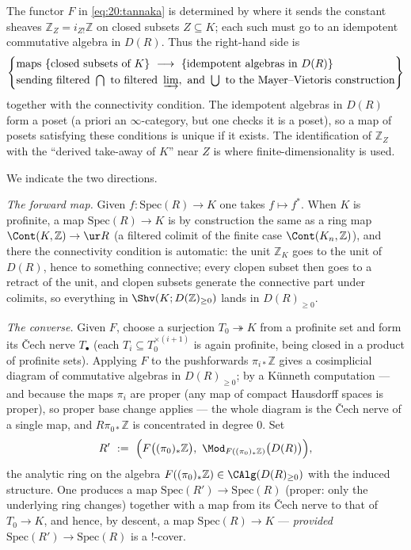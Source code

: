 \begin{remark}
\label{rmk:20:idempotents}
The functor $F$ in \eqref{eq:20:tannaka} is determined by where it sends the
constant sheaves $\mathbb Z_Z=i_{Z!}\mathbb Z$ on closed subsets $Z\subseteq K$;
each such must go to an idempotent commutative algebra in $D(R)$. Thus the
right-hand side is
\begin{equation*}
\left\{
\begin{aligned}
&\text{maps }\{\text{closed subsets of }K\}\ \longrightarrow\ \{\text{idempotent
algebras in }D(R)\}\\
&\text{sending filtered }\textstyle\bigcap\text{ to filtered }\varinjlim,\
\text{and }\bigcup\text{ to the Mayer--Vietoris construction}
\end{aligned}
\right\}
\end{equation*}
together with the connectivity condition. The idempotent algebras in $D(R)$ form
a poset (a priori an $\infty$-category, but one checks it is a poset), so a map
of posets satisfying these conditions is unique if it exists. The identification
of $\mathbb Z_Z$ with the ``derived take-away of $K$'' near $Z$ is where
finite-dimensionality is used.
\end{remark}

We indicate the two directions.

\emph{The forward map.} Given $f\colon\mathrm{Spec}(R)\to K$ one takes $f\mapsto
f^*$. When $K$ is profinite, a map $\mathrm{Spec}(R)\to K$ is by construction the
same as a ring map $\Cont(K,\mathbb Z)\to\ur R$ (a filtered colimit of the
finite case $\Cont(K_n,\mathbb Z)$), and there the connectivity condition is
automatic: the unit $\mathbb Z_K$ goes to the unit of $D(R)$, hence to something
connective; every clopen subset then goes to a retract of the unit, and clopen
subsets generate the connective part under colimits, so everything in
$\Shv(K;D(\mathbb Z)_{\ge0})$ lands in $D(R)_{\ge0}$.

\emph{The converse.} Given $F$, choose a surjection $T_0\twoheadrightarrow K$
from a profinite set and form its \v Cech nerve $T_\bullet$ (each
$T_i\subseteq T_0^{\times(i+1)}$ is again profinite, being closed in a product of
profinite sets). Applying $F$ to the pushforwards $\pi_{i*}\mathbb Z$ gives a
cosimplicial diagram of commutative algebras in $D(R)_{\ge0}$; by a K\"unneth
computation --- and because the maps $\pi_i$ are proper (any map of compact
Hausdorff spaces is proper), so proper base change applies --- the whole diagram
is the \v Cech nerve of a single map, and $R\pi_{0*}\mathbb Z$ is concentrated in
degree $0$. Set
\begin{equation*}
R'\ :=\ \Bigl(F\bigl((\pi_0)_*\mathbb Z\bigr),\ \Mod_{F((\pi_0)_*\mathbb Z)}
\bigl(D(R)\bigr)\Bigr),
\end{equation*}
the analytic ring on the algebra $F((\pi_0)_*\mathbb Z)\in\CAlg(D(R)_{\ge0})$
with the induced structure. One produces a map $\mathrm{Spec}(R')\to
\mathrm{Spec}(R)$ (proper: only the underlying ring changes) together with a map
from its \v Cech nerve to that of $T_0\to K$, and hence, by descent, a map
$\mathrm{Spec}(R)\to K$ --- \emph{provided} $\mathrm{Spec}(R')\to\mathrm{Spec}(R)$
is a $!$-cover.

